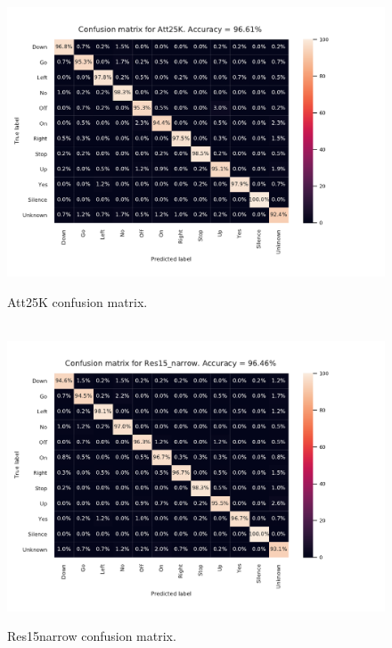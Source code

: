 
\begin{figure}[htbp]
\hbox{ \includegraphics[scale=.57]{conf_att.pdf}}
\caption{Att25K confusion matrix.}
\label{conf_att}
\end{figure}

\begin{figure}[htbp]
\hbox{ \includegraphics[scale=.57]{conf_res.pdf}}
\caption{Res15narrow confusion matrix.}
\label{conf_res}
\end{figure}


